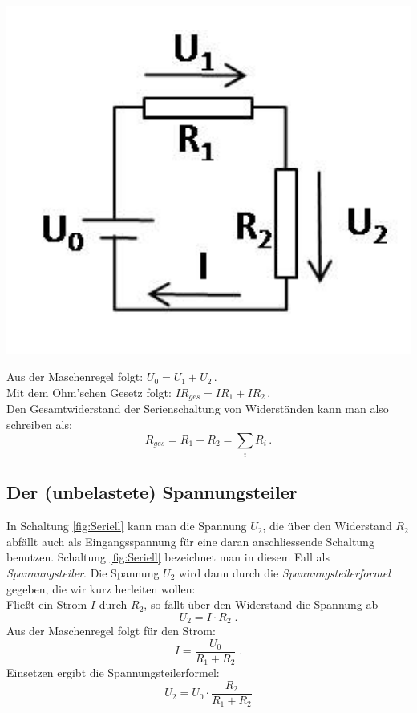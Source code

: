 \begin{minipage}{0.35\textwidth}
 \includegraphics[width=1.00\textwidth]{Abbildungen/Seriell.jpg}
 \label{fig:Seriell}
\end{minipage}
%
\begin{minipage}{0.6\textwidth}
Aus der Maschenregel folgt: \hfill $U_0 = U_1 + U_2\, .$\\
Mit dem Ohm'schen Gesetz folgt: \hfill $I R_{ges} = I R_1 + I R_2\, .$\\
Den Gesamtwiderstand der Serienschaltung von Widerständen kann man also schreiben als: 
\begin{equation}
R_{ges} = R_1 + R_2 = \sum_i{R_i} \, .
\end{equation}
\end{minipage}
%
\subsection{Der (unbelastete) Spannungsteiler}

In Schaltung \ref{fig:Seriell} kann man die Spannung $U_2$, die über den Widerstand $R_2$ abfällt auch als Eingangsspannung für eine daran anschliessende Schaltung benutzen. Schaltung \ref{fig:Seriell} bezeichnet man in diesem Fall als \textit{Spannungsteiler}. Die Spannung $U_2$ wird dann durch die \textit{Spannungsteilerformel} gegeben, die wir kurz herleiten wollen:\\
Fließt ein Strom $I$ durch $R_2$, so fällt über den Widerstand die Spannung ab
\begin{equation*}
U_2 = I\cdot R_2\; .
\end{equation*}
Aus der Maschenregel folgt für den Strom:
\begin{equation*}
I = \frac{U_0}{R_1 + R_2} \; .
\end{equation*}
Einsetzen ergibt die Spannungsteilerformel:
\begin{equation}\label{eq:Spannungsteiler}
U_2 = U_0\cdot\frac{R_2}{R_1+R_2}
\end{equation}

